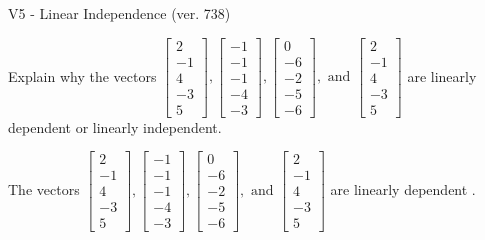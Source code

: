 \begin{exercise}
  \begin{exerciseTitle}V5 - Linear Independence (ver. 738)\end{exerciseTitle}
  \begin{exerciseStatement}
    Explain why the vectors \(\left[\begin{array}{r}
2 \\
-1 \\
4 \\
-3 \\
5
\end{array}\right] , \left[\begin{array}{r}
-1 \\
-1 \\
-1 \\
-4 \\
-3
\end{array}\right] , \left[\begin{array}{r}
0 \\
-6 \\
-2 \\
-5 \\
-6
\end{array}\right] , \text{ and } \left[\begin{array}{r}
2 \\
-1 \\
4 \\
-3 \\
5
\end{array}\right]\) are linearly dependent or linearly independent.	


  \end{exerciseStatement}
  \begin{exerciseAnswer}
   The vectors \(\left[\begin{array}{r}
2 \\
-1 \\
4 \\
-3 \\
5
\end{array}\right] , \left[\begin{array}{r}
-1 \\
-1 \\
-1 \\
-4 \\
-3
\end{array}\right] , \left[\begin{array}{r}
0 \\
-6 \\
-2 \\
-5 \\
-6
\end{array}\right] , \text{ and } \left[\begin{array}{r}
2 \\
-1 \\
4 \\
-3 \\
5
\end{array}\right]\) are 
  	 linearly dependent  .
  


  \end{exerciseAnswer}
\end{exercise}